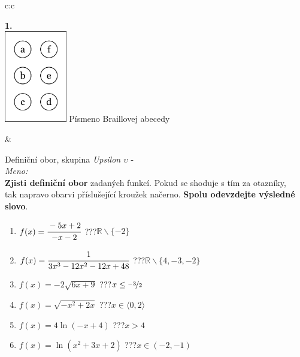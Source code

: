 \documentclass[10pt]{report}
\begin{document}
\begin{tabular}{c:c}
\begin{minipage}[c][99mm][t]{0.49\linewidth}
\begin{center}
\begin{minipage}{0.20\linewidth}
\begin{center}
{\Huge\bfseries 1.} \\[2mm]
\includegraphics[height=40mm]{../images/braille.png}
{\small Písmeno Braillovej abecedy}
\end{center}
\end{minipage}
\end{center}
\end{minipage}
&
\begin{minipage}[c][99mm][t]{0.49\linewidth}
\begin{center}
\vspace{7mm}
{\huge Definiční obor, skupina \textit{Upsilon $\upsilon$} -}\\[4.5mm]
\textit{Meno:}\phantom{xxxxxxxxxxxxxxxxxxxxxxxxxxxxxxxxxxxxxxxxxxxxxxxxxxxxxxxxxxxxxxxxx}\\[3.5mm]
\textbf{Zjisti definiční obor} zadaných funkcí. Pokud se shoduje s tím za otazníky,\\tak napravo obarvi příslušející kroužek načerno. \textbf{Spolu odevzdejte výsledné slovo}.\\[3mm]
\begin{minipage}{0.77\linewidth}
\begin{center}
\begin{varwidth}{\textwidth}
\begin{enumerate}
\normalsize
\item $f(x)=\cfrac{-5x+2}{-x-2}$\quad \dotfill\; ???\;\dotfill \quad $\mathbb{R}\smallsetminus\{-2\}$
\item $f(x)=\cfrac{1}{3x^3-12x^2-12x+48}$\quad \dotfill\; ???\;\dotfill \quad $\mathbb{R}\smallsetminus\{4,-3,-2\}$
\item $f(x)=-2\sqrt{6x+9}$\quad \dotfill\; ???\;\dotfill \quad $x\leq\nicefrac{-3}{2}$
\item $f(x)=\sqrt{-x^2+2x}$\quad \dotfill\; ???\;\dotfill \quad $x\in\langle0 , 2\rangle$
\item $f(x)=4\ln{(-x+4)}$\quad \dotfill\; ???\;\dotfill \quad $x>4$
\item $f(x)=\ln{(x^2+3x+2)}$\quad \dotfill\; ???\;\dotfill \quad $x\in(-2 , -1)$

\end{enumerate}
\end{varwidth}
\end{center}
\end{minipage}
\end{center}
\end{minipage}
\end{tabular}
\end{document}
